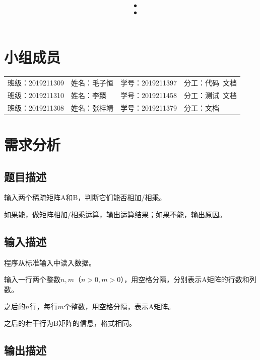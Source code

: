 \documentclass{article}
\title{\hmwkClass\ ：\hmwkTitle}
\author{\hmwkAuthorName}
\begin{document}
\maketitle  

\section*{小组成员}

\setlength{\tabcolsep}{9mm}
{
    \begin{table}[htbp]
        \centering
        \begin{tabular}{llll}
            班级：2019211309 & 姓名：毛子恒 & 学号：2019211397 & 分工：代码\ 文档 \\
            
            班级：2019211310 & 姓名：李臻   & 学号：2019211458 & 分工：测试\ 文档 \\
            
            班级：2019211308 & 姓名：张梓靖 & 学号：2019211379 & 分工：文档       \\
        \end{tabular}
    \end{table}
}

\tableofcontents
\newpage

\section{需求分析}

\subsection{题目描述}

输入两个稀疏矩阵A和B，判断它们能否相加/相乘。

如果能，做矩阵相加/相乘运算，输出运算结果；如果不能，输出原因。

\subsection{输入描述}

程序从标准输入中读入数据。

输入一行两个整数$n,m$（$n>0,m>0$），用空格分隔，分别表示A矩阵的行数和列数。

之后的$n$行，每行$m$个整数，用空格分隔，表示A矩阵。

之后的若干行为B矩阵的信息，格式相同。

\subsection{输出描述}
\end{document}

